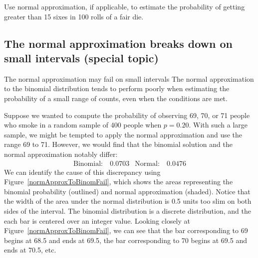 \begin{exercisewrap}
\begin{nexercise}
Use normal approximation, if applicable, to estimate the probability of getting greater than 15 sixes in 100 rolls of a fair die.\footnotemark
\end{nexercise}
\end{exercisewrap}


\subsection{The normal approximation breaks down on small intervals (special topic)}

\begin{onebox}{The normal approximation may fail on small intervals}
{The normal approximation to the binomial distribution tends to perform poorly when estimating the probability of a small range of counts, even when the conditions are met.}
\end{onebox}

Suppose we wanted to compute the probability of observing 69, 70, or 71 people who smoke in a random sample of 400 people when $p=0.20$. With such a large sample, we might be tempted to apply the normal approximation and use the range 69 to 71. However, we would find that the binomial solution and the normal approximation notably differ:
\begin{align*}
\text{Binomial:}&\ 0.0703
&\text{Normal:}&\ 0.0476
\end{align*}
We can identify the cause of this discrepancy using Figure~\ref{normApproxToBinomFail}, which shows the areas representing the binomial probability (outlined) and normal approximation (shaded). Notice that the width of the area under the normal distribution is 0.5 units too slim on both sides of the interval. The binomial distribution is a discrete distribution, and the each bar is centered over an integer value. Looking closely at Figure~\ref{normApproxToBinomFail}, we can see that the bar corresponding to 69 begins at 68.5 and ends at 69.5, the bar corresponding to 70 begins at 69.5 and ends at 70.5, etc.

